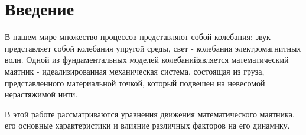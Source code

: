 \section{Введение}
В нашем мире множество процессов представляют собой колебания: 
звук представляет собой колебания упругой среды, свет - колебания электромагнитных волн. 
Одной из фундаментальных моделей  колебанийявляется математический маятник - идеализированная механическая система, состоящая из груза, представленного материальной точкой, который подвешен на невесомой нерастяжимой нити.

В этой работе рассматриваются уравнения движения математического маятника, его основные характеристики и влияние различных факторов на его динамику.